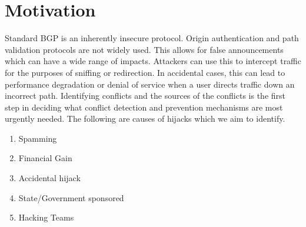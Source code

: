  \section{Motivation}\label{sec:motivation}
 

 

Standard BGP is an inherently insecure protocol. Origin authentication and path validation protocols are not widely used. This allows for false announcements which can have a wide range of impacts. Attackers can use this to intercept traffic for the purposes of sniffing or redirection. In accidental cases, this can lead to performance degradation or denial of service when a user directs traffic down an incorrect path. Identifying conflicts and the sources of the conflicts is the first step in deciding what conflict detection and prevention mechanisms are most urgently needed. The following are causes of hijacks which we aim to identify.


 \begin{enumerate}
 \item Spamming
 \item Financial Gain 
 \item Accidental hijack
 \item State/Government sponsored
 \item Hacking Teams
 \end{enumerate}


